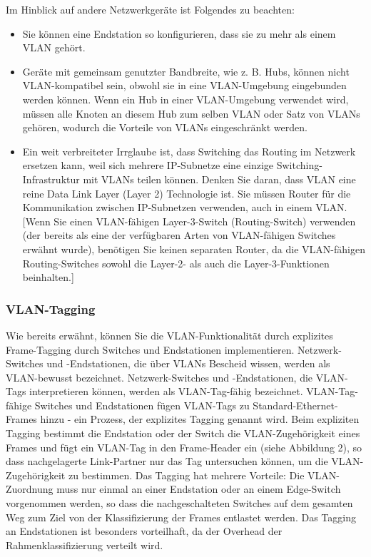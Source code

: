         Im Hinblick auf andere Netzwerkgeräte ist Folgendes zu beachten:
        \begin{itemize}
            \item Sie können eine Endstation so konfigurieren, dass sie zu mehr als einem VLAN gehört.
            \item Geräte mit gemeinsam genutzter Bandbreite, wie z. B. Hubs, können nicht VLAN-kompatibel sein, obwohl sie in eine VLAN-Umgebung eingebunden werden können. Wenn ein Hub in einer VLAN-Umgebung verwendet wird, müssen alle Knoten an diesem Hub zum selben VLAN oder Satz von VLANs gehören, wodurch die Vorteile von VLANs eingeschränkt werden.
            \item Ein weit verbreiteter Irrglaube ist, dass Switching das Routing im Netzwerk ersetzen kann, weil sich mehrere IP-Subnetze eine einzige Switching-Infrastruktur mit VLANs teilen können. Denken Sie daran, dass VLAN eine reine Data Link Layer (Layer 2) Technologie ist. Sie müssen Router für die Kommunikation zwischen IP-Subnetzen verwenden, auch in einem VLAN. [Wenn Sie einen VLAN-fähigen Layer-3-Switch (Routing-Switch) verwenden (der bereits als eine der verfügbaren Arten von VLAN-fähigen Switches erwähnt wurde), benötigen Sie keinen separaten Router, da die VLAN-fähigen Routing-Switches sowohl die Layer-2- als auch die Layer-3-Funktionen beinhalten.]
        \end{itemize}

        \subsubsection{VLAN-Tagging}
        Wie bereits erwähnt, können Sie die VLAN-Funktionalität durch explizites Frame-Tagging 
        durch Switches und Endstationen implementieren. Netzwerk-Switches und -Endstationen, die 
        über VLANs Bescheid wissen, werden als VLAN-bewusst bezeichnet. Netzwerk-Switches und -Endstationen, die VLAN-Tags interpretieren können, werden als VLAN-Tag-fähig bezeichnet. VLAN-Tag-fähige Switches und Endstationen fügen VLAN-Tags zu Standard-Ethernet-Frames hinzu - ein Prozess, der explizites Tagging genannt wird. Beim expliziten Tagging bestimmt die Endstation oder der Switch die VLAN-Zugehörigkeit eines Frames und fügt ein VLAN-Tag in den Frame-Header ein (siehe Abbildung 2), so dass nachgelagerte Link-Partner nur das Tag untersuchen können, um die VLAN-Zugehörigkeit zu bestimmen.
        Das Tagging hat mehrere Vorteile: Die VLAN-Zuordnung muss nur einmal an einer Endstation oder an einem Edge-Switch vorgenommen werden, so dass die nachgeschalteten Switches auf dem gesamten Weg zum Ziel von der Klassifizierung der Frames entlastet werden. Das Tagging an Endstationen ist besonders vorteilhaft, da der Overhead der Rahmenklassifizierung verteilt wird.

